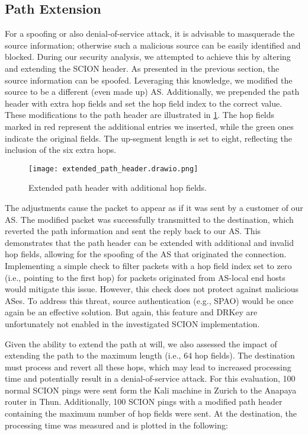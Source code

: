 \subsection{Path Extension}
\label{sec:path-extension}
For a spoofing or also denial-of-service attack, it is advisable to masquerade the source information; otherwise such a malicious source can be easily identified and blocked.
During our security analysis, we attempted to achieve this by altering and extending the SCION header.
As presented in the previous section, the source information can be spoofed.
Leveraging this knowledge, we modified the source to be a different (even made up) AS.
Additionally, we prepended the path header with extra hop fields and set the hop field index to the correct value.
These modifications to the path header are illustrated in \cref{extended_path_header}.
The hop fields marked in red represent the additional entries we inserted, while the green ones indicate the original fields.
The up-segment length is set to eight, reflecting the inclusion of the six extra hops.

\begin{figure}[h]
    \centering
    \texttt{[image: extended\_path\_header.drawio.png]}
    \caption{Extended path header with additional hop fields.}
    \label{extended_path_header}
\end{figure}

The adjustments cause the packet to appear as if it was sent by a customer of our AS.
The modified packet was successfully transmitted to the destination, which reverted the path information and sent the reply back to our AS.
This demonstrates that the path header can be extended with additional and invalid hop fields, allowing for the spoofing of the AS that originated the connection.
Implementing a simple check to filter packets with a hop field index set to zero (i.e., pointing to the first hop) for packets originated from AS-local end hosts would mitigate this issue.
However, this check does not protect against malicious ASes.
To address this threat, source authentication (e.g., SPAO) would be once again be an effective solution.
But again, this feature and DRKey are unfortunately not enabled in the investigated SCION implementation.

Given the ability to extend the path at will, we also assessed the impact of extending the path to the maximum length (i.e., 64 hop fields).
The destination must process and revert all these hops, which may lead to increased processing time and potentially result in a denial-of-service attack.
For this evaluation, 100 normal SCION pings were sent form the Kali machine in Zurich to the Anapaya router in Thun.
Additionally, 100 SCION pings with a modified path header containing the maximum number of hop fields were sent.
At the destination, the processing time was measured and is plotted in the following:

